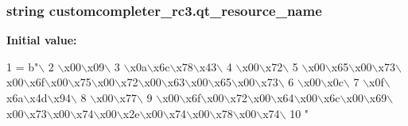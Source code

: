 \subsubsection[{qt\+\_\+resource\+\_\+name}]{\setlength{\rightskip}{0pt plus 5cm}string customcompleter\+\_\+rc3.\+qt\+\_\+resource\+\_\+name}\label{namespacecustomcompleter__rc3_afca8500d99fff36c7ff4d71f6901e3e5}
{\bfseries Initial value\+:}
\begin{DoxyCode}
1 = b\textcolor{stringliteral}{"\(\backslash\)}
2 \textcolor{stringliteral}{\(\backslash\)x00\(\backslash\)x09\(\backslash\)}
3 \textcolor{stringliteral}{\(\backslash\)x0a\(\backslash\)x6c\(\backslash\)x78\(\backslash\)x43\(\backslash\)}
4 \textcolor{stringliteral}{\(\backslash\)x00\(\backslash\)x72\(\backslash\)}
5 \textcolor{stringliteral}{\(\backslash\)x00\(\backslash\)x65\(\backslash\)x00\(\backslash\)x73\(\backslash\)x00\(\backslash\)x6f\(\backslash\)x00\(\backslash\)x75\(\backslash\)x00\(\backslash\)x72\(\backslash\)x00\(\backslash\)x63\(\backslash\)x00\(\backslash\)x65\(\backslash\)x00\(\backslash\)x73\(\backslash\)}
6 \textcolor{stringliteral}{\(\backslash\)x00\(\backslash\)x0c\(\backslash\)}
7 \textcolor{stringliteral}{\(\backslash\)x0f\(\backslash\)x6a\(\backslash\)x4d\(\backslash\)x94\(\backslash\)}
8 \textcolor{stringliteral}{\(\backslash\)x00\(\backslash\)x77\(\backslash\)}
9 \textcolor{stringliteral}{\(\backslash\)x00\(\backslash\)x6f\(\backslash\)x00\(\backslash\)x72\(\backslash\)x00\(\backslash\)x64\(\backslash\)x00\(\backslash\)x6c\(\backslash\)x00\(\backslash\)x69\(\backslash\)x00\(\backslash\)x73\(\backslash\)x00\(\backslash\)x74\(\backslash\)x00\(\backslash\)x2e\(\backslash\)x00\(\backslash\)x74\(\backslash\)x00\(\backslash\)x78\(\backslash\)x00\(\backslash\)x74\(\backslash\)}
10 \textcolor{stringliteral}{"}
\end{DoxyCode}
\hypertarget{namespacecustomcompleter__rc3_a2e42e21a7d0fed639e25f0340eb37d4d}{}
